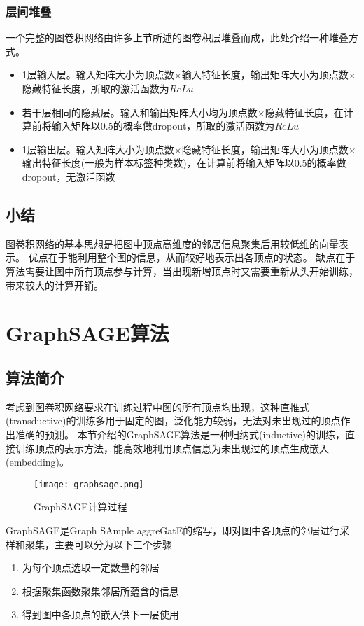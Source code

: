 \subsubsection{层间堆叠}
一个完整的图卷积网络由许多上节所述的图卷积层堆叠而成，此处介绍一种堆叠方式。

\begin{itemize}
    \item 1层输入层。输入矩阵大小为顶点数$\times$输入特征长度，输出矩阵大小为顶点数$\times$隐藏特征长度，所取的激活函数为$ReLu$
    \item 若干层相同的隐藏层。输入和输出矩阵大小均为顶点数$\times$隐藏特征长度，在计算前将输入矩阵以0.5的概率做dropout，所取的激活函数为$ReLu$
    \item 1层输出层。输入矩阵大小为顶点数$\times$隐藏特征长度，输出矩阵大小为顶点数$\times$输出特征长度(一般为样本标签种类数)，在计算前将输入矩阵以0.5的概率做dropout，无激活函数
\end{itemize}

\subsection{小结}
图卷积网络的基本思想是把图中顶点高维度的邻居信息聚集后用较低维的向量表示。
优点在于能利用整个图的信息，从而较好地表示出各顶点的状态。
缺点在于算法需要让图中所有顶点参与计算，当出现新增顶点时又需要重新从头开始训练，带来较大的计算开销。

\section{GraphSAGE算法}

\subsection{算法简介}
考虑到图卷积网络要求在训练过程中图的所有顶点均出现，这种直推式(transductive)的训练多用于固定的图，泛化能力较弱，无法对未出现过的顶点作出准确的预测。
本节介绍的GraphSAGE算法是一种归纳式(inductive)的训练，直接训练顶点的表示方法，能高效地利用顶点信息为未出现过的顶点生成嵌入(embedding)。

\begin{figure}[htb]
    \centering
    \texttt{[image: graphsage.png]}
    \caption{GraphSAGE计算过程}
  \end{figure}

GraphSAGE是Graph SAmple aggreGatE的缩写，即对图中各顶点的邻居进行采样和聚集，主要可以分为以下三个步骤
\begin{enumerate}
    \item 为每个顶点选取一定数量的邻居
    \item 根据聚集函数聚集邻居所蕴含的信息
    \item 得到图中各顶点的嵌入供下一层使用
\end{enumerate}

